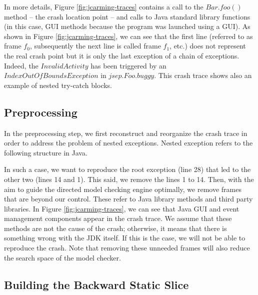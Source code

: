 \documentclass[12pt]{report}
\begin{document}
In more details, Figure \ref{fig:jcarming-traces} contains a call to the
\(Bar.foo()\) method -- the crash location point -- and calls to Java
standard library functions (in this case, GUI methods because the
program was launched using a GUI). As shown in Figure
\ref{fig:jcarming-traces}, we can see that the first line (referred to
as frame \emph{\(f_0\)}, subsequently the next line is called frame
\emph{\(f_1\)}, etc.) does not represent the real crash point but it is
only the last exception of a chain of exceptions. Indeed, the
\(InvalidActivity\) has been triggered by an
\(IndexOutOfBoundsException\) in \(jsep.Foo.buggy\). This crash trace
shows also an example of nested try-catch blocks.

\subsection{Preprocessing}\label{preprocessing}

In the preprocessing step, we first reconstruct and reorganize the crash
trace in order to address the problem of nested exceptions. Nested
exception refers to the following structure in Java.

\noindent{}

In such a case, we want to reproduce the root exception (line 28) that
led to the other two (lines 14 and 1). This said, we remove the lines 1
to 14. Then, with the aim to guide the directed model checking engine
optimally, we remove frames that are beyond our control. These refer to
Java library methods and third party libraries. In Figure
\ref{fig:jcarming-traces}, we can see that Java GUI and event management
components appear in the crash trace. We assume that these methods are
not the cause of the crash; otherwise, it means that there is something
wrong with the JDK itself. If this is the case, we will not be able to
reproduce the crash. Note that removing these unneeded frames will also
reduce the search space of the model checker.

\subsection{Building the Backward Static
Slice}\label{building-the-backward-static-slice}
\end{document}
